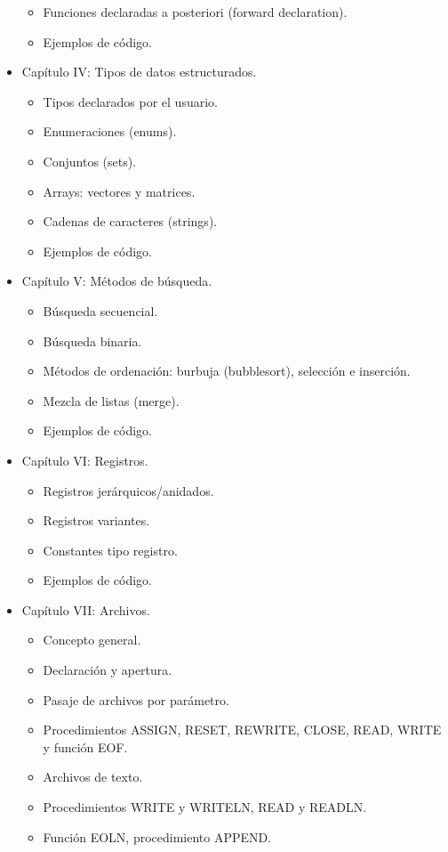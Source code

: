 \documentclass{article}
\begin{document}
\begin{itemize}
\begin{itemize}
	\item Funciones declaradas a posteriori (forward declaration).
	\item Ejemplos de código.
	\end{itemize}	
\item Capítulo IV: Tipos de datos estructurados.
	\begin{itemize}
	\item Tipos declarados por el usuario.
	\item Enumeraciones (enums).
	\item Conjuntos (sets).
	\item Arrays: vectores y matrices.
	\item Cadenas de caracteres (strings).
	\item Ejemplos de código.
	\end{itemize}
\item Capítulo V: Métodos de búsqueda.
	\begin{itemize}
	\item Búsqueda secuencial.
	\item Búsqueda binaria.
	\item Métodos de ordenación: burbuja (bubblesort), selección e inserción.
	\item Mezcla de listas (merge).
	\item Ejemplos de código.
	\end{itemize}
\item Capítulo VI: Registros.
	\begin{itemize}
	\item Registros jerárquicos/anidados.
	\item Registros variantes.
	\item Constantes tipo registro.
	\item Ejemplos de código.
	\end{itemize}
\item Capítulo VII: Archivos.
	\begin{itemize}
	\item Concepto general.
	\item Declaración y apertura.
	\item Pasaje de archivos por parámetro.
	\item Procedimientos ASSIGN, RESET, REWRITE, CLOSE, READ, WRITE y función EOF.
	\item Archivos de texto.
	\item Procedimientos WRITE y WRITELN, READ y READLN.
	\item Función EOLN, procedimiento APPEND.

\end{itemize}
\end{itemize}
\end{document}

